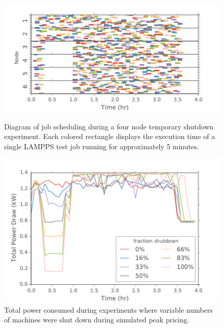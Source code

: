 \begin{figure}[t]
	\begin{center}
		\includegraphics[scale=0.55]{edeals/usage_viz4}
		\label{fig:usage_viz}
	\end{center}
	\caption{Diagram of job scheduling during a four node temporary shutdown experiment. Each colored rectangle displays the execution time of a single LAMPPS test job running for approximately 5 minutes.}
	
\end{figure}

\begin{figure}[t]
	\begin{center}
		\includegraphics[scale=0.55]{edeals/power_viz}
	\end{center}
	\caption{Total power consumed during experiments where variable numbers of machines were shut down during simulated peak pricing.}
	\label{power_viz}
\end{figure}

